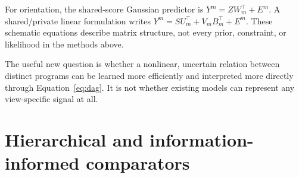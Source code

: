\documentclass[11pt,a4paper]{article}
\numberwithin{equation}{section}
\begin{document}
For orientation, the shared-score Gaussian predictor is
\(Y^m=ZW_m^\top+E^m\). A shared/private linear formulation writes
\(Y^m=SU_m^\top+V_m B_m^\top+E^m\).
These schematic equations describe matrix structure, not every prior,
constraint, or likelihood in the methods above.

The useful new question is whether a nonlinear, uncertain relation between
distinct programs can be learned more efficiently and interpreted more
directly through Equation~\eqref{eq:dag}. It is not whether existing models
can represent any view-specific signal at all.

\clearpage
\section{Hierarchical and information-informed comparators}
\end{document}
